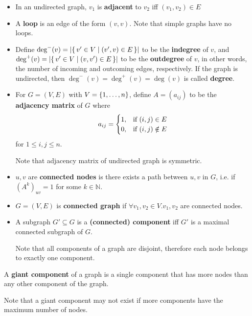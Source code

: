 \begin{definition_with_break}
    \begin{itemize}[leftmargin=*]
        \item In an undirected graph, $v_1$ is \textbf{adjacent} to $v_2$ iff $(v_1, v_2) \in E$
        \item A \textbf{loop} is an edge of the form $(v, v)$.
        Note that simple graphs have no loops.
        \item Define $\deg^-(v) = \left\lvert \left\{\, v' \in V \mid (v', v) \in E \, \right\} \right\rvert$ to be the \textbf{indegree} of $v$, and $\deg^+(v) = \left\lvert \left\{\, v' \in V \mid (v, v') \in E \, \right\} \right\rvert$ to be the \textbf{outdegree} of $v$, in other words, the number of incoming and outcoming edges, respectively.
        If the graph is undirected, then $\deg^-(v) = \deg^+(v) = \deg(v)$ is called \textbf{degree}.
        \item For $G = (V, E)$ with $V = \left\{1, \dots, n\right\}$, define $A = (a_{ij})$ to be the \textbf{adjacency matrix} of $G$ where
        \[ a_{ij} = \begin{cases}
                        1, & \textnormal{if}\ (i, j) \in E \\
                        0, & \textnormal{if}\ (i, j) \notin E
        \end{cases} \]
        for $1 \leq i, j \leq n$.

        Note that adjacency matrix of undirected graph is symmetric.
    \end{itemize}
\end{definition_with_break}

\begin{definition}[Connectedness]
    \begin{itemize}[leftmargin=*]
        \item $u, v$ are \textbf{connected nodes} is there exists a path between $u, v$ in $G$, i.e. if $(A^k)_{uv} = 1$ for some $k\in \mathbb{N}$.
        \item $G = (V, E)$ is \textbf{connected graph} if $\forall v_1, v_2 \in V. v_1, v_2$ are connected nodes.
        \item A subgraph $G' \subseteq G$ is a \textbf{(connected) component} iff $G'$ is a maximal connected subgraph of $G$.

        Note that all components of a graph are disjoint, therefore each node belongs to exactly one component.
    \end{itemize}

    \item A \textbf{giant component} of a graph is a single component that has more nodes than any other component of the graph.

    Note that a giant component may not exist if more components have the maximum number of nodes.
\end{definition}


